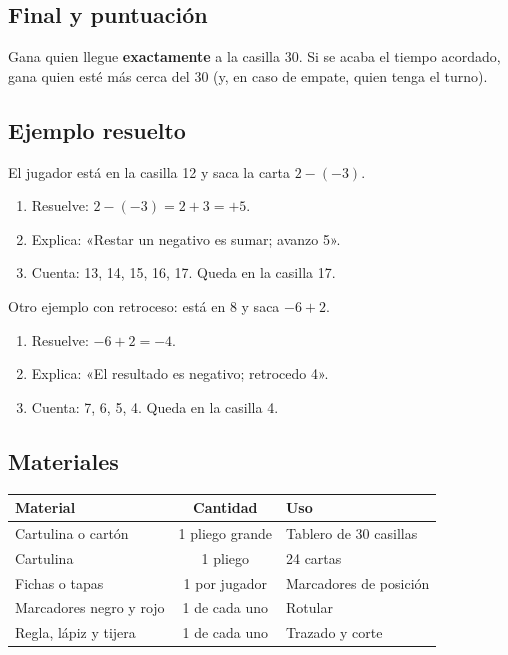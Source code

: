 \documentclass[12pt, letterpaper]{article}
\begin{document}
\subsection{Final y puntuación}

Gana quien llegue \textbf{exactamente} a la casilla 30. Si se acaba el tiempo acordado, gana quien esté más cerca del 30 (y, en caso de empate, quien tenga el turno).

\subsection{Ejemplo resuelto}

El jugador está en la casilla 12 y saca la carta $2-(-3)$.

\begin{cuadrosolucion}
\begin{enumerate}[leftmargin=*]
  \item Resuelve: $2-(-3)=2+3=+5$.
  \item Explica: «Restar un negativo es sumar; avanzo 5».
  \item Cuenta: 13, 14, 15, 16, 17. Queda en la casilla 17.
\end{enumerate}
Otro ejemplo con retroceso: está en 8 y saca $-6+2$.
\begin{enumerate}[leftmargin=*]
  \item Resuelve: $-6+2=-4$.
  \item Explica: «El resultado es negativo; retrocedo 4».
  \item Cuenta: 7, 6, 5, 4. Queda en la casilla 4.
\end{enumerate}
\end{cuadrosolucion}

\subsection{Materiales}

\begin{center}
\small
\begin{tabular}{@{}p{5.0cm} c p{7.4cm}@{}}
\toprule
\textbf{Material} & \textbf{Cantidad} & \textbf{Uso}\\
\midrule
Cartulina o cartón & 1 pliego grande & Tablero de 30 casillas\\
Cartulina & 1 pliego & 24 cartas\\
Fichas o tapas & 1 por jugador & Marcadores de posición\\
Marcadores negro y rojo & 1 de cada uno & Rotular\\
Regla, lápiz y tijera & 1 de cada uno & Trazado y corte\\
\bottomrule
\end{tabular}
\end{center}
\end{document}
